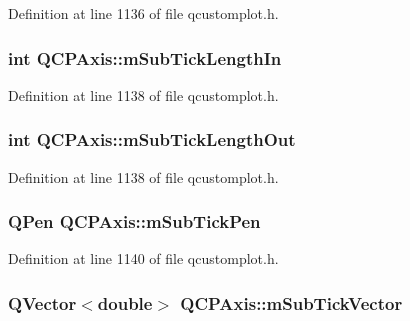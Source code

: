 Definition at line 1136 of file qcustomplot.\-h.

\hypertarget{class_q_c_p_axis_a6c1400cfa6fb129a6686797fb5ca0307}{
\subsubsection[{m\-Sub\-Tick\-Length\-In}]{\setlength{\rightskip}{0pt plus 5cm}int Q\-C\-P\-Axis\-::m\-Sub\-Tick\-Length\-In\hspace{0.3cm}{\ttfamily [protected]}}}\label{class_q_c_p_axis_a6c1400cfa6fb129a6686797fb5ca0307}


Definition at line 1138 of file qcustomplot.\-h.

\hypertarget{class_q_c_p_axis_ae0342609ad543c2667673d75b43d9dbb}{
\subsubsection[{m\-Sub\-Tick\-Length\-Out}]{\setlength{\rightskip}{0pt plus 5cm}int Q\-C\-P\-Axis\-::m\-Sub\-Tick\-Length\-Out\hspace{0.3cm}{\ttfamily [protected]}}}\label{class_q_c_p_axis_ae0342609ad543c2667673d75b43d9dbb}


Definition at line 1138 of file qcustomplot.\-h.

\hypertarget{class_q_c_p_axis_a32ef56d3a417866720eb12667d27dbd1}{
\subsubsection[{m\-Sub\-Tick\-Pen}]{\setlength{\rightskip}{0pt plus 5cm}Q\-Pen Q\-C\-P\-Axis\-::m\-Sub\-Tick\-Pen\hspace{0.3cm}{\ttfamily [protected]}}}\label{class_q_c_p_axis_a32ef56d3a417866720eb12667d27dbd1}


Definition at line 1140 of file qcustomplot.\-h.

\hypertarget{class_q_c_p_axis_a28353081e0ff35c3fe5ced923a287faa}{
\subsubsection[{m\-Sub\-Tick\-Vector}]{\setlength{\rightskip}{0pt plus 5cm}Q\-Vector$<$double$>$ Q\-C\-P\-Axis\-::m\-Sub\-Tick\-Vector\hspace{0.3cm}{\ttfamily [protected]}}}\label{class_q_c_p_axis_a28353081e0ff35c3fe5ced923a287faa}


